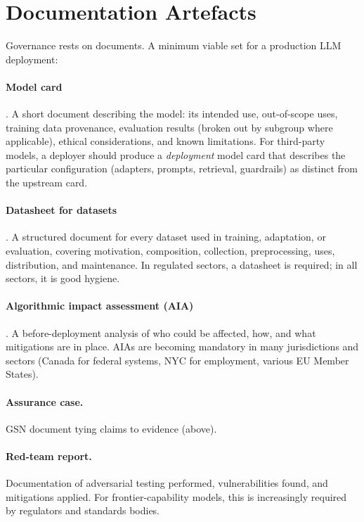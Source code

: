 \section{Documentation Artefacts}

Governance rests on documents. A minimum viable set for a
production LLM deployment:

\paragraph{Model card} \citep{mitchell2019modelcards}. A short
document describing the model: its intended use, out-of-scope
uses, training data provenance, evaluation results (broken out
by subgroup where applicable), ethical considerations, and
known limitations. For third-party models, a deployer should
produce a \emph{deployment} model card that describes the
particular configuration (adapters, prompts, retrieval,
guardrails) as distinct from the upstream card.

\paragraph{Datasheet for datasets}
\citep{gebru2021datasheets}. A structured document for every
dataset used in training, adaptation, or evaluation, covering
motivation, composition, collection, preprocessing, uses,
distribution, and maintenance. In regulated sectors, a
datasheet is required; in all sectors, it is good hygiene.

\paragraph{Algorithmic impact assessment (AIA)}
\citep{metcalf2021algorithmic}. A before-deployment analysis of
who could be affected, how, and what mitigations are in place.
AIAs are becoming mandatory in many jurisdictions and sectors
(Canada for federal systems, NYC for employment, various EU
Member States).

\paragraph{Assurance case.} GSN document tying claims to
evidence (above).

\paragraph{Red-team report.} Documentation of adversarial testing
performed, vulnerabilities found, and mitigations applied. For
frontier-capability models, this is increasingly required by
regulators and standards bodies.

